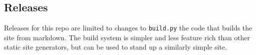\href{https://github.com/open-physics-ed-org/open-physics-ed-org.github.io/blob/main/LICENSE}{}

\subsection{Releases}\label{releases}

Releases for this repo are limited to changes to \texttt{build.py} the
code that builds the site from markdown. The build system is simpler and
less feature rich than other static site generators, but can be used to
stand up a similarly simple site.

\href{https://github.com/open-physics-ed-org/open-physics-ed-org.github.io/releases}{}
